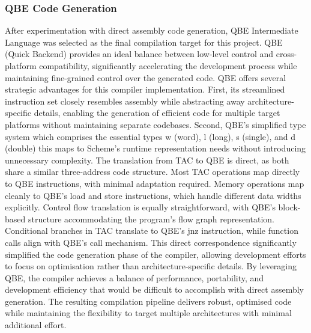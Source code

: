 \documentclass[final]{cmpreport_02}
\begin{document}
\subsubsection{QBE Code Generation}
After experimentation with direct assembly code generation, QBE Intermediate Language \cite{qbe_il} was selected as the final compilation target for this project. QBE (Quick Backend) provides an ideal balance between low-level control and cross-platform compatibility, significantly accelerating the development process while maintaining fine-grained control over the generated code.
QBE offers several strategic advantages for this compiler implementation. First, its streamlined instruction set closely resembles assembly while abstracting away architecture-specific details, enabling the generation of efficient code for multiple target platforms without maintaining separate codebases. Second, QBE's simplified type system which comprises the essential types w (word), l (long), s (single), and d (double) this maps to Scheme's runtime representation needs without introducing unnecessary complexity.
The translation from TAC to QBE is direct, as both share a similar three-address code structure. Most TAC operations map directly to QBE instructions, with minimal adaptation required. Memory operations map cleanly to QBE's load and store instructions, which handle different data widths explicitly.
Control flow translation is equally straightforward, with QBE's block-based structure accommodating the program's flow graph representation. Conditional branches in TAC translate to QBE's jnz instruction, while function calls align with QBE's call mechanism. This direct correspondence significantly simplified the code generation phase of the compiler, allowing development efforts to focus on optimisation rather than architecture-specific details.
By leveraging QBE, the compiler achieves a balance of performance, portability, and development efficiency that would be difficult to accomplish with direct assembly generation. The resulting compilation pipeline delivers robust, optimised code while maintaining the flexibility to target multiple architectures with minimal additional effort.
\end{document}
